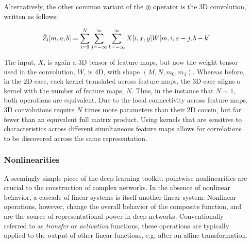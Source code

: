 Alternatively, the other common variant of the $\circledast$ operator is the 3D convolution, written as follows:

\begin{equation}
\label{eq:convolution}
\small
\hat{Z}_l[m, a, b] =\sum_{i=0}^{N} \sum_{j=-\infty}^{\infty} \sum_{k=-\infty}^{\infty} X[i, x, y]W[m, i, a - j, b - k]
\end{equation}

\noindent The input, $X$, is again a 3D tensor of feature maps, but now the weight tensor used in the convolution, $W$, is 4D, with shape $(M, N, m_0, m_1)$.
Whereas before, in the 2D case, each kernel translated across feature maps, the 3D case aligns a kernel with the number of feature maps, $N$.
Thus, in the instance that $N=1$, both operations are equivalent.
Due to the local connectivity across feature maps, 3D convolutions require $N$ times more parameters than their 2D cousin, but far fewer than an equivalent full matrix product.
Using kernels that are sensitive to characteristics across different simultaneous feature maps allows for correlations to be discovered across the same representation.






\subsubsection{Nonlinearities}

A seemingly simple piece of the deep learning toolkit, pointwise nonlinearities are crucial to the construction of complex networks.
In the absence of nonlinear behavior, a cascade of linear systems is itself another linear system.
Nonlinear operations, however, change the overall behavior of the composite function, and are the source of representational power in deep networks.
Conventionally referred to as \emph{transfer} or \emph{activation} functions, these operations are typically applied to the output of other linear functions, e.g. after an affine transformation.

